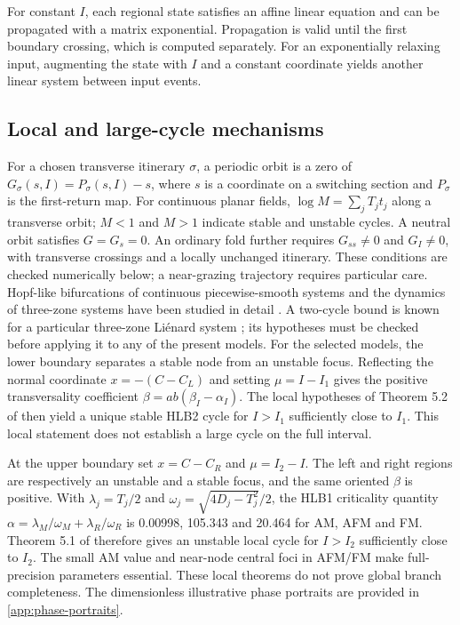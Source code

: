 \documentclass[final,5p,times,twocolumn]{elsarticle}
\begin{document}
For constant $I$, each regional state satisfies an affine linear equation
and can be propagated with a matrix exponential. Propagation is valid until
the first boundary crossing, which is computed separately. For an
exponentially relaxing input, augmenting the state with $I$ and a constant
coordinate yields another linear system between input events.

\subsection{Local and large-cycle mechanisms}
For a chosen transverse itinerary $\sigma$, a periodic orbit is a zero of
$G_\sigma(s,I)=P_\sigma(s,I)-s$, where $s$ is a coordinate on a switching
section and $P_\sigma$ is the first-return map. For continuous planar fields,
$\log M=\sum_j T_jt_j$ along a transverse orbit; $M<1$ and $M>1$ indicate
stable and unstable cycles. A neutral orbit satisfies $G=G_s=0$. An ordinary
fold further requires $G_{ss}\ne0$ and $G_I\ne0$, with transverse crossings
and a locally unchanged itinerary. These conditions are checked numerically
below; a near-grazing trajectory requires particular care.
Hopf-like bifurcations of continuous piecewise-smooth systems and the dynamics
of three-zone systems have been studied in detail
\cite{Simpson2022,SimpsonMeiss2007,LlibrePonceValls2015,ChenLiXieYue2017}.
A two-cycle bound is known for a particular three-zone Liénard system
\cite{ChenFengJiaMeng2026}; its hypotheses must be checked before applying it
to any of the present models.
For the selected models, the lower boundary separates a stable node from an
unstable focus. Reflecting the normal coordinate $x=-(C-C_L)$ and setting
$\mu=I-I_1$ gives the positive transversality coefficient
$\beta=ab(\beta_I-\alpha_I)$. The local hypotheses of Theorem 5.2 of
\cite{Simpson2022} then yield a unique stable HLB2 cycle for $I>I_1$
sufficiently close to $I_1$. This local statement does not establish a large
cycle on the full interval.

At the upper boundary set $x=C-C_R$ and $\mu=I_2-I$. The left and right
regions are respectively an unstable and a stable focus, and the same
oriented $\beta$ is positive. With $\lambda_j=T_j/2$ and
$\omega_j=\sqrt{4D_j-T_j^2}/2$, the HLB1 criticality quantity
$\alpha=\lambda_M/\omega_M+\lambda_R/\omega_R$ is 0.00998, 105.343 and
20.464 for AM, AFM and FM. Theorem 5.1 of \cite{Simpson2022} therefore gives
an unstable local cycle for $I>I_2$ sufficiently close to $I_2$. The small
AM value and near-node central foci in AFM/FM make full-precision parameters
essential. These local theorems do not prove global branch completeness.
The dimensionless illustrative phase portraits are provided in \ref{app:phase-portraits}.
\end{document}
